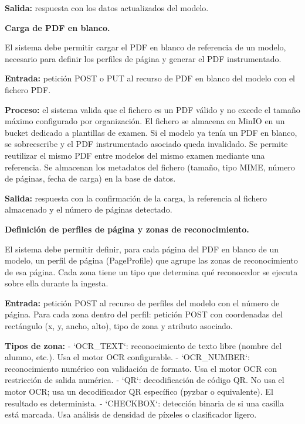 \begin{functional}
\begin{functional}
    \textbf{Salida:} respuesta con los datos actualizados del modelo.

    \item \textbf{Carga de PDF en blanco.}

    El sistema debe permitir cargar el PDF en blanco de referencia de un modelo, necesario para definir los perfiles de página y generar el PDF instrumentado.

    \textbf{Entrada:} petición POST o PUT al recurso de PDF en blanco del modelo con el fichero PDF.

    \textbf{Proceso:} el sistema valida que el fichero es un PDF válido y no excede el tamaño máximo configurado por organización. El fichero se almacena en MinIO en un bucket dedicado a plantillas de examen. Si el modelo ya tenía un PDF en blanco, se sobreescribe y el PDF instrumentado asociado queda invalidado. Se permite reutilizar el mismo PDF entre modelos del mismo examen mediante una referencia. Se almacenan los metadatos del fichero (tamaño, tipo MIME, número de páginas, fecha de carga) en la base de datos.

    \textbf{Salida:} respuesta con la confirmación de la carga, la referencia al fichero almacenado y el número de páginas detectado.

    \item \textbf{Definición de perfiles de página y zonas de reconocimiento.}

    El sistema debe permitir definir, para cada página del PDF en blanco de un modelo, un perfil de página (PageProfile) que agrupe las zonas de reconocimiento de esa página. Cada zona tiene un tipo que determina qué reconocedor se ejecuta sobre ella durante la ingesta.

    \textbf{Entrada:} petición POST al recurso de perfiles del modelo con el número de página. Para cada zona dentro del perfil: petición POST con coordenadas del rectángulo (x, y, ancho, alto), tipo de zona y atributo asociado.

    \textbf{Tipos de zona:} - `OCR\_TEXT`: reconocimiento de texto libre (nombre del alumno, etc.). Usa el motor OCR configurable. - `OCR\_NUMBER`: reconocimiento numérico con validación de formato. Usa el motor OCR con restricción de salida numérica. - `QR`: decodificación de código QR. No usa el motor OCR; usa un decodificador QR específico (pyzbar o equivalente). El resultado es determinista. - `CHECKBOX`: detección binaria de si una casilla está marcada. Usa análisis de densidad de píxeles o clasificador ligero.


\end{functional}
\end{functional}
